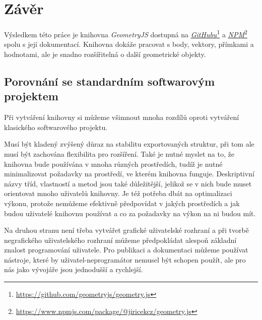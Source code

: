 \chapter{Závěr}
\label{chap:conclusion}

Výsledkem této práce je knihovna \textit{GeometryJS} dostupná na \textit{\hyperlink{https://github.com/geometryjs/geometry.js}{GitHubu}}\footnote{\url{https://github.com/geometryjs/geometry.js}} a \textit{\hyperlink{https://www.npmjs.com/package/@jiricekcz/geometry.js}{NPM}}\footnote{\url{https://www.npmjs.com/package/@jiricekcz/geometry.js}} spolu s její dokumentací.
Knihovna dokáže pracovat s body, vektory, přímkami a hodnotami, ale je snadno rozšířitelná o další geometrické objekty.

\section{Porovnání se standardním softwarovým projektem}
\label{sec:comparison}

Při vytváření knihovny si můžeme všimnout mnoha rozdílů oproti vytváření klasického softwarového projektu.

Musí být kladený zvýšený důraz na stabilitu exportovaných struktur, při tom ale musí být zachována flexibilita pro rozšíření.
Také je nutné myslet na to, že knihovna bude používána v mnoha různých prostředích, tudíž je nutné minimalizovat požadavky na prostředí, ve kterém knihovna funguje.
Deskriptivní názvy tříd, vlastností a metod jsou také důležitější, jelikož se v nich bude muset orientovat mnoho uživatelů knihovny.
Je též potřeba dbát na optimalizaci výkonu, protože nemůžeme efektivně předpovídat v jakých prostředích a jak budou uživatelé knihovnu používat a co za požadavky na výkon na ni budou mít.

Na druhou stranu není třeba vytvářet grafické uživatelské rozhraní a při tvorbě negrafického uživatelského rozhraní můžeme předpokládat alespoň základní znalost programování uživatele.
Pro publikaci a dokumentaci můžeme používat nástroje, které by uživatel-neprogramátor nemusel být schopen použít, ale pro nás jako vývojáře jsou jednodušší a rychlejší.

